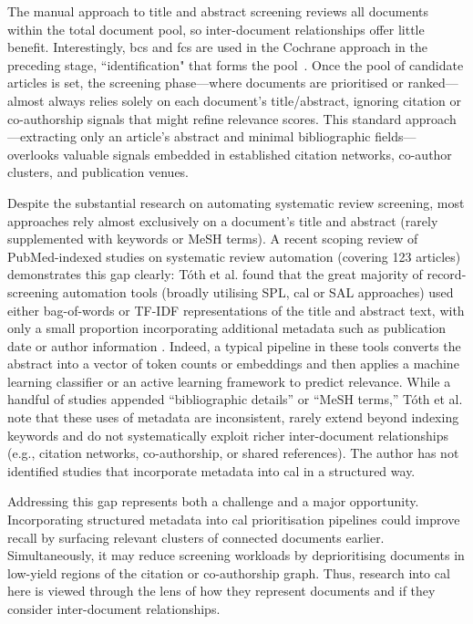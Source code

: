 \documentclass[10pt,oneside]{book}
\begin{document}
The manual approach to title and abstract screening reviews all documents within the total document pool, so inter-document relationships offer little benefit. Interestingly, \gls*{bcs} and \gls*{fcs} are used in the Cochrane approach in the preceding stage, ``identification" that forms the pool~\cite{briscoe_conduct_2020, noauthor_mecir_nodate}. Once the pool of candidate articles is set, the screening phase—where documents are prioritised or ranked—almost always relies solely on each document’s title/abstract, ignoring citation or co-authorship signals that might refine relevance scores. This standard approach—extracting only an article’s abstract and minimal bibliographic fields—overlooks valuable signals embedded in established citation networks, co-author clusters, and publication venues.

Despite the substantial research on automating systematic review screening, most approaches rely almost exclusively on a document’s title and abstract (rarely supplemented with keywords or MeSH terms). A recent scoping review of PubMed-indexed studies on systematic review automation (covering 123 articles) demonstrates this gap clearly: Tóth et al. found that the great majority of record-screening automation tools (broadly utilising SPL, \gls*{cal} or SAL approaches) used either bag-of-words or TF-IDF representations of the title and abstract text, with only a small proportion incorporating additional metadata such as publication date or author information \cite{toth_automation_2024}. Indeed, a typical pipeline in these tools converts the abstract into a vector of token counts or embeddings and then applies a machine learning classifier or an active learning framework to predict relevance. While a handful of studies appended ``bibliographic details” or ``MeSH terms,” Tóth et al. note that these uses of metadata are inconsistent, rarely extend beyond indexing keywords and do not systematically exploit richer inter-document relationships (e.g., citation networks, co-authorship, or shared references). The author has not identified studies that incorporate metadata into \gls*{cal} in a structured way. 

Addressing this gap represents both a challenge and a major opportunity. Incorporating structured metadata into \gls*{cal} prioritisation pipelines could improve recall by surfacing relevant clusters of connected documents earlier. Simultaneously, it may reduce screening workloads by deprioritising documents in low-yield regions of the citation or co-authorship graph. Thus, research into \gls*{cal} here is viewed through the lens of how they represent documents and if they consider inter-document relationships.  
\end{document}
